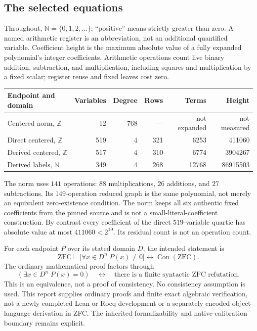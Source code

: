 \documentclass[11pt,a4paper]{article}
\newcommand{\Z}{\mathbb Z}\newcommand{\N}{\mathbb N}
\newcommand{\Con}{\operatorname{Con}}\newcommand{\vp}{v_p}
\theoremstyle{remark}\newtheorem{remark}[theorem]{Remark}
\begin{document}
\subsection{The selected equations}
Throughout, $\N=\{0,1,2,\ldots\}$; ``positive'' means strictly greater than zero. A named arithmetic register is an abbreviation, not an additional quantified variable. Coefficient height is the maximum absolute value of a fully expanded polynomial's integer coefficients. Arithmetic operations count live binary addition, subtraction, and multiplication, including squares and multiplication by a fixed scalar; register reuse and fixed leaves cost zero.
\begin{center}\small
\begin{tabular}{@{}lrrrrr@{}}\toprule
Endpoint and domain & Variables & Degree & Rows & Terms & Height\\\midrule
Centered norm, $\Z$ &12&768&---&not expanded&not measured\\
Direct centered, $\Z$ &519&4&321&6253&411060\\
Derived centered, $\Z$ &517&4&310&6774&3904267\\
Derived labels, $\N$ &349&4&268&12768&86915503\\\bottomrule
\end{tabular}\end{center}
The norm uses $141$ operations: $88$ multiplications, $26$ additions, and $27$ subtractions. Its $149$-operation reduced graph is the same polynomial, not merely an equivalent zero-existence condition. The norm keeps all six authentic fixed coefficients from the pinned source and is not a small-literal-coefficient construction. By contrast every coefficient of the direct $519$-variable quartic has absolute value at most $411060<2^{19}$. Its residual count is not an operation count.

For each endpoint $P$ over its stated domain $D$, the intended statement is
\begin{equation}\label{eq:logical}
 \mathrm{ZFC}\vdash
 \bigl[\forall x\in D^n\;P(x)\ne0\bigr]
 \longleftrightarrow\Con(\mathrm{ZFC}).
\end{equation}
The ordinary mathematical proof factors through
\[
 (\exists x\in D^n\;P(x)=0)
 \quad\longleftrightarrow\quad
 \text{there is a finite syntactic ZFC refutation}.
\]
This is an equivalence, not a proof of consistency. No consistency assumption is used. This report supplies ordinary proofs and finite exact algebraic verification, not a newly completed Lean or Rocq development or a separately encoded object-language derivation in ZFC. The inherited formalizability and native-calibration boundary remains explicit.
\end{document}
